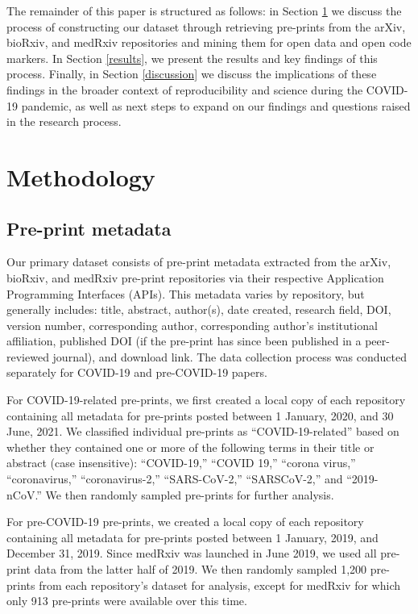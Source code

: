 \documentclass[
]{article}
\begin{document}
The remainder of this paper is structured as follows: in Section \ref{methodology} we discuss the process of constructing our dataset through retrieving pre-prints from the arXiv, bioRxiv, and medRxiv repositories and mining them for open data and open code markers. In Section \ref{results}, we present the results and key findings of this process. Finally, in Section \ref{discussion} we discuss the implications of these findings in the broader context of reproducibility and science during the COVID-19 pandemic, as well as next steps to expand on our findings and questions raised in the research process.

\hypertarget{methodology}{%
\section{Methodology}\label{methodology}}

\hypertarget{pre-print-metadata}{%
\subsection{Pre-print metadata}\label{pre-print-metadata}}

Our primary dataset consists of pre-print metadata extracted from the arXiv, bioRxiv, and medRxiv pre-print repositories via their respective Application Programming Interfaces (APIs). This metadata varies by repository, but generally includes: title, abstract, author(s), date created, research field, DOI, version number, corresponding author, corresponding author's institutional affiliation, published DOI (if the pre-print has since been published in a peer-reviewed journal), and download link. The data collection process was conducted separately for COVID-19 and pre-COVID-19 papers.

For COVID-19-related pre-prints, we first created a local copy of each repository containing all metadata for pre-prints posted between 1 January, 2020, and 30 June, 2021.
We classified individual pre-prints as ``COVID-19-related'' based on whether they contained one or more of the following terms in their title or abstract (case insensitive): ``COVID-19,'' ``COVID 19,'' ``corona virus,'' ``coronavirus,'' ``coronavirus-2,'' ``SARS-CoV-2,'' ``SARSCoV-2,'' and ``2019-nCoV.'' We then randomly sampled pre-prints for further analysis.

For pre-COVID-19 pre-prints, we created a local copy of each repository containing all metadata for pre-prints posted between 1 January, 2019, and December 31, 2019. Since medRxiv was launched in June 2019, we used all pre-print data from the latter half of 2019. We then randomly sampled 1,200 pre-prints from each repository's dataset for analysis, except for medRxiv for which only 913 pre-prints were available over this time.
\end{document}
